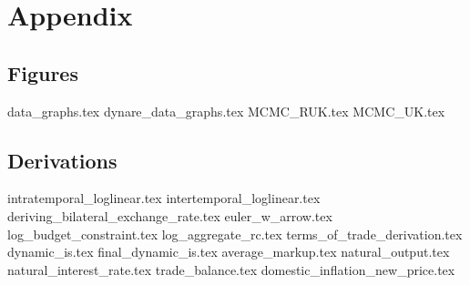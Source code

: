 \section{Appendix}
\subsection{Figures}
{data_graphs.tex}
{dynare_data_graphs.tex}
{MCMC_RUK.tex}
{MCMC_UK.tex}

\subsection{Derivations}
\renewcommand{\theequation}{A.\arabic{equation}}
\small
{intratemporal_loglinear.tex}
{intertemporal_loglinear.tex}
{deriving_bilateral_exchange_rate.tex}
{euler_w_arrow.tex}
{log_budget_constraint.tex}
{log_aggregate_rc.tex}
{terms_of_trade_derivation.tex}
{dynamic_is.tex}
{final_dynamic_is.tex}
{average_markup.tex}
{natural_output.tex}
{natural_interest_rate.tex}
{trade_balance.tex}
{domestic_inflation_new_price.tex}
